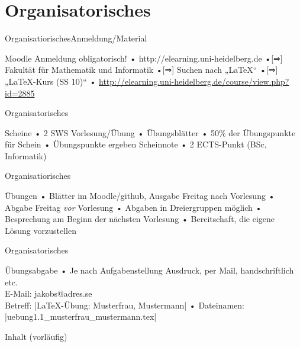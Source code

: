


\section{Organisatorisches}
\begin{frame}{Organisatiorisches}{Anmeldung/Material}
\begin{block}{Moodle}
Anmeldung obligatorisch!
• http://elearning.uni-heidelberg.de
•[⇒] Fakultät für Mathematik und Informatik
•[⇒] Suchen nach „LaTeX“
•[⇒] „LaTeX-Kurs (SS 10)“
• \url{http://elearning.uni-heidelberg.de/course/view.php?id=2885}
\•
\end{block}
\end{frame}

\begin{frame}{Organisatorisches}
\begin{block}{Scheine}
• 2 SWS Vorlesung/Übung
• Übungsblätter
• 50\% der Übungspunkte für Schein
• Übungspunkte ergeben Scheinnote
• 2 ECTS-Punkt (BSc, Informatik)
\•
\end{block}
\end{frame}

\begin{frame}{Organisatiorisches}
\begin{block}{Übungen}
• Blätter im Moodle/github, Ausgabe Freitag nach Vorlesung
• Abgabe Freitag \emph{vor} Vorlesung
• Abgaben in Dreiergruppen möglich
• Besprechung am Beginn der nächsten Vorlesung
• Bereitschaft, die eigene Lösung vorzustellen
\•
\end{block}
\end{frame}

\begin{frame}[fragile]{Organisatorisches}
\begin{block}{Übungsabgabe}
• Je nach Aufgabenstellung Ausdruck, per Mail, handschriftlich etc.%
\\ E-Mail: jakobs@adres.se\\%
Betreff: |LaTeX-Übung: Musterfrau, Mustermann|
• Dateinamen: |uebung1.1_musterfrau_mustermann.tex|
\•
\end{block}
\end{frame}

\begin{frame}{Inhalt (vorläufig)}
\end{frame}

